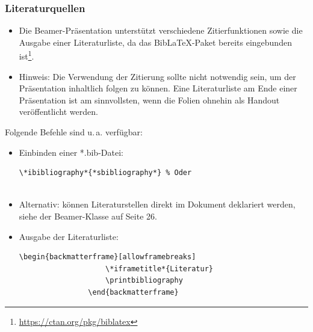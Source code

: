 \documentclass[german,notoc]{tudbeamer}%
\begin{document}
\begin{frame}[fragile]\frametitle{Literaturquellen}
    \begin{itemize}
    	\item Die Beamer-Präsentation unterstützt verschiedene Zitierfunktionen sowie die Ausgabe einer Literaturliste, da das BibLaTeX-Paket bereits eingebunden ist\footnote[frame]{\url{https://ctan.org/pkg/biblatex}}.
    	\item Hinweis: Die Verwendung der Zitierung sollte nicht notwendig sein, um der Präsentation inhaltlich folgen zu können.
    	      Eine Literaturliste am Ende einer Präsentation ist am sinnvollsten, wenn die Folien ohnehin als Handout veröffentlicht werden.
    \end{itemize}		
	Folgende Befehle sind u.\,a. verfügbar:
	\begin{itemize}
		\item Einbinden einer *.bib-Datei:
			\begin{lstlisting}[gobble=8,style=latex]
				\*ibibliography*{*sbibliography*} % Oder
				
			\end{lstlisting}
		\item Alternativ: können Literaturstellen direkt im Dokument deklariert werden, siehe 
			\hyperlink{http://www.ctan.org/tex-archive/macros/latex/contrib/beamer/doc/beameruserguide.pdf}{} der Beamer-Klasse auf Seite 26.
		\item Ausgabe der Literaturliste:
			\begin{lstlisting}[gobble=8,style=latex]
				\begin{backmatterframe}[allowframebreaks]
					\*iframetitle*{Literatur}
					\printbibliography
				\end{backmatterframe}
			\end{lstlisting}
	\end{itemize}
\end{frame}
\end{document}
